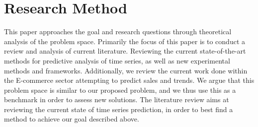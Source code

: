 \section{Research Method}
\label{section:Introduction:research-method}

This paper approaches the goal and research questions through theoretical analysis
of the problem space.
Primarily the focus of this paper is to conduct a review and analysis of current literature.
Reviewing the current state-of-the-art methods for predictive analysis of time series,
as well as new experimental methods and frameworks.
Additionally, we review the current work done within the E-commerce sector attempting to predict sales and trends.
We argue that this problem space is similar to our proposed problem, and we thus use this as a benchmark in order to assess new solutions.
The literature review aims at reviewing the current state of time series prediction,
in order to best find a method to achieve our goal described above.

